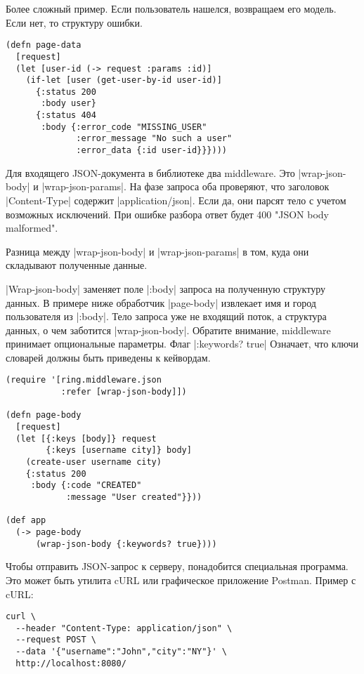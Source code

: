 Более сложный пример. Если пользователь нашелся, возвращаем его модель. Если
нет, то структуру ошибки.

\begin{verbatim}
(defn page-data
  [request]
  (let [user-id (-> request :params :id)]
    (if-let [user (get-user-by-id user-id)]
      {:status 200
       :body user}
      {:status 404
       :body {:error_code "MISSING_USER"
              :error_message "No such a user"
              :error_data {:id user-id}}})))
\end{verbatim}

Для входящего JSON-документа в библиотеке два middleware. Это \spverb|wrap-json-body| и
\spverb|wrap-json-params|. На фазе запроса оба проверяют, что заголовок \spverb|Content-Type|
содержит \spverb|application/json|. Если да, они парсят тело с учетом возможных
исключений. При ошибке разбора ответ будет 400 "JSON body malformed".

Разница между \spverb|wrap-json-body| и \spverb|wrap-json-params| в том, куда они складывают
полученные данные.

\spverb|Wrap-json-body| заменяет поле \spverb|:body| запроса на полученную структуру данных. В
примере ниже обработчик \spverb|page-body| извлекает имя и город пользователя из
\spverb|:body|. Тело запроса уже не входящий поток, а структура данных, о чем заботится
\spverb|wrap-json-body|. Обратите внимание, middleware принимает опциональные
параметры. Флаг \spverb|:keywords? true| Означает, что ключи словарей должны быть
приведены к кейвордам.

\begin{verbatim}
(require '[ring.middleware.json
           :refer [wrap-json-body]])

(defn page-body
  [request]
  (let [{:keys [body]} request
        {:keys [username city]} body]
    (create-user username city)
    {:status 200
     :body {:code "CREATED"
            :message "User created"}}))

(def app
  (-> page-body
      (wrap-json-body {:keywords? true})))
\end{verbatim}

Чтобы отправить JSON-запрос к серверу, понадобится специальная программа. Это
может быть утилита cURL или графическое приложение Postman. Пример с cURL:

\begin{verbatim}
curl \
  --header "Content-Type: application/json" \
  --request POST \
  --data '{"username":"John","city":"NY"}' \
  http://localhost:8080/
\end{verbatim}

